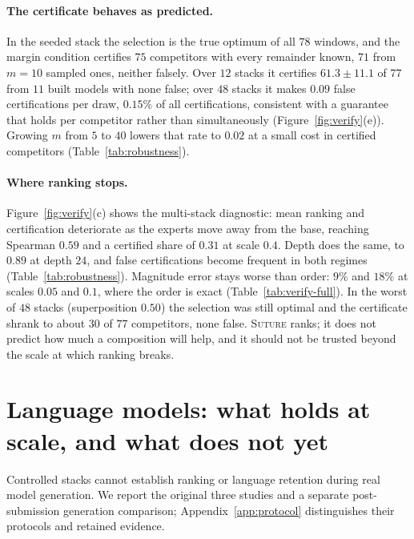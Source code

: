 \documentclass{article}
\theoremstyle{plain}
\theoremstyle{definition}
\theoremstyle{remark}
\begin{document}
\paragraph{The certificate behaves as predicted.}
In the seeded stack the selection is the true optimum of all $78$ windows, and
the margin condition certifies $75$ competitors with every remainder known, $71$
from $m=10$ sampled ones, neither falsely. Over
$12$ stacks it certifies $61.3\pm11.1$ of $77$ from $11$ built models with none
false; over $48$ stacks it makes $0.09$ false certifications per draw, $0.15\%$
of all certifications, consistent with a guarantee that holds per competitor
rather than simultaneously (Figure~\ref{fig:verify}(e)). Growing $m$ from $5$ to $40$ lowers that rate to
$0.02$ at a small cost in certified competitors (Table~\ref{tab:robustness}).

\paragraph{Where ranking stops.}
Figure~\ref{fig:verify}(c) shows the multi-stack diagnostic: mean ranking and
certification deteriorate as the experts move away from the base, reaching
Spearman $0.59$ and a certified share of $0.31$ at scale $0.4$. Depth does the
same, to $0.89$ at depth $24$, and false certifications become frequent in both
regimes (Table~\ref{tab:robustness}).
Magnitude error stays worse than order:
$9\%$ and $18\%$ at scales $0.05$ and $0.1$, where the order is exact
(Table~\ref{tab:verify-full}). In the worst of $48$ stacks
(superposition $0.50$) the selection was still optimal and the certificate shrank
to about $30$ of $77$ competitors, none false. \textsc{Suture} ranks; it does not predict how much a
composition will help, and it should not be trusted beyond the scale at which
ranking breaks.

\section{Language models: what holds at scale, and what does not yet}
\label{sec:protocol}

Controlled stacks cannot establish ranking or language retention during real
model generation. We report the original three studies and a separate
post-submission generation comparison; Appendix~\ref{app:protocol} distinguishes
their protocols and retained evidence.
\end{document}
